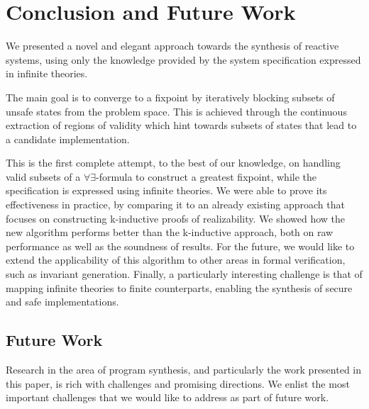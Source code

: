 \section{Conclusion and Future Work}
\label{sec:conclusion}


We presented a novel and elegant approach towards the synthesis
of reactive systems, using only the knowledge provided by the
system specification expressed in infinite theories.
\iffalse
 The approach is
directly inspired from previous work on Property Directed Reachability, with the objective being the construction of inductive
invariants that can be used as a proof to the specification's realizability.
\fi
The main goal is to converge to a fixpoint by iteratively blocking subsets of
unsafe states from the problem space. This is achieved through the continuous
extraction of regions of validity which hint towards subsets of states that
lead to a candidate implementation.

This is the first complete attempt, to the best of our knowledge, on handling
valid subsets of a $\forall\exists$-formula to construct a greatest fixpoint,
while the specification is expressed using infinite theories. We were able to
prove its effectiveness in practice, by comparing it to an already existing
approach that focuses on constructing k-inductive proofs of realizability. We showed how the new algorithm performs better than the k-inductive approach, both on raw performance as well as the soundness of results. For the future, we would like to extend the applicability of this algorithm to other areas in formal verification, such as invariant generation. Finally, a particularly interesting challenge is that of mapping infinite theories to finite counterparts, enabling the synthesis of secure and safe implementations. 

\iffalse
\subsection{Future Work}
Research in the area of program synthesis, and particularly the work presented in this paper, is rich with challenges and promising directions. We enlist the most important challenges that we would like to address as part of future work.

